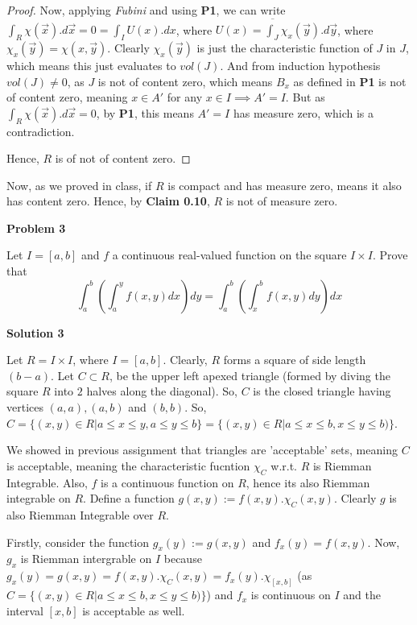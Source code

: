 \documentclass[12pt,a4paper]{article}
\theoremstyle{definition}
\begin{document}
\begin{flushleft}
\begin{proof}
	\medskip

	Now, applying {\it Fubini} and using {\bf P1}, we can write $\int_{R} \chi (\vec{x}).d\vec{x} = 0 =\int_{I} U(x).dx$, where $U(x) = \overline{\int_{J}} \chi_{x} (\vec{y}).d\vec{y}$, where $\chi_{x} (\vec{y}) = \chi (x,\vec{y})$. Clearly $\chi_{x} (\vec{y})$ is just the characteristic function of $J$ in $J$, which means this just evaluates to $vol(J)$. And from induction hypothesis $vol(J) \ne 0$, as $J$ is not of content zero, which means $B_x$ as defined in {\bf P1} is not of content zero, meaning $x \in A'$ for any $x \in I \implies A' = I$. But as $\int_{R} \chi (\vec{x}).d\vec{x} = 0$, by {\bf P1}, this means $A' = I$ has measure zero, which is a contradiction.

	\medskip 

	Hence, $R$ is of not of content zero.
\end{proof}

Now, as we proved in class, if $R$ is compact and has measure zero, means it also has content zero. Hence, by {\bf Claim 0.10}, $R$ is not of measure zero.

\newpage

{\bf  Problem 3}

Let $I=[a,b]$ and $f$ a continuous real-valued function on the square $I \times I$. Prove that
\[
\int_a^b(\int_a^y f(x,y)dx)dy=\int_a^b(\int_x^b f(x,y)dy)dx
\]

\bigskip

{\bf Solution 3}

\medskip

Let $R = I \times I$, where $I = [a,b]$. Clearly, $R$ forms a square of side length $(b-a)$. Let $C \subset R$, be the upper left apexed triangle (formed by diving the square $R$ into $2$ halves along the diagonal). So, $C$ is the closed triangle having vertices $(a, a), (a, b)$ and $(b, b)$. So, $C =  \{(x, y) \in R | a \le x \le y , a \le y \le b\} = \{(x, y) \in R | a \le x \le b , x \le y \le b)\}$.

We showed in previous assignment that triangles are 'acceptable' sets, meaning $C$ is acceptable, meaning the characteristic fucntion $\chi_C$ w.r.t. $R$ is Riemman Integrable.
Also, $f$ is a continuous function on $R$, hence its also Riemman integrable on $R$.
Define a function $g(x,y):=f(x,y).\chi_C (x,y)$. Clearly $g$ is also Riemman Integrable over $R$.

\medskip

Firstly, consider the function $g_x (y) := g(x,y)$ and $f_x (y) = f(x,y)$. Now, $g_x$ is Riemman intergrable on $I$ because $g_x (y) = g(x,y) = f(x,y).\chi_{C} (x,y) = f_x (y).\chi_{[x,b]}$ (as $C = \{(x, y) \in R | a \le x \le b , x \le y \le b)\}$) and $f_x$ is continuous on $I$ and the interval $[x,b]$ is acceptable as well.


\end{flushleft}
\end{document}
